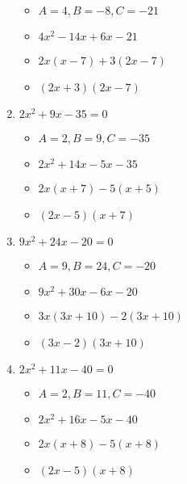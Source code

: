 \begin{enumerate}
\begin{itemize}
  \item $A=4, B=-8, C=-21$
  \item $4x^{2}-14x+6x-21$
  \item $2x(x-7)+3(2x-7)$
  \item $(2x+3)(2x-7)$
  \end{itemize}
\item $2x^{2} + 9x - 35 =0$
  \begin{itemize}
  \item $A=2, B=9, C=-35$
  \item $2x^{2}+14x-5x-35$
  \item $2x(x+7)-5(x+5)$
  \item $(2x-5)(x+7)$
  \end{itemize}
\item $9x^{2} + 24x - 20 = 0$
  \begin{itemize}
  \item $A=9, B=24, C=-20$
  \item $9x^{2}+30x-6x-20$
  \item $3x(3x+10)-2(3x+10)$
  \item $(3x-2)(3x+10)$
  \end{itemize}
\item $2x^{2} + 11x - 40 = 0$
  \begin{itemize}
  \item $A=2, B=11, C=-40$
  \item $2x^{2}+16x-5x-40$
  \item $2x(x+8)-5(x+8)$
  \item $(2x-5)(x+8)$
  \end{itemize}
\end{enumerate}
